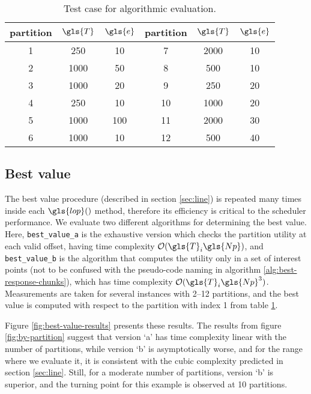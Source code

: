 \documentclass[main.tex]{subfiles}
\begin{document}
\begin{table}[htbp]
    \centering
    \caption{Test case for algorithmic evaluation.}
    \label{tab:case1}
    \begin{tabular}{ccc|ccc}
        \toprule
        partition & $\gls{T}$ & $\gls{e}$ & partition & $\gls{T}$ & $\gls{e}$ \\
        \midrule
        \num{1}  &  \num{250 } & \num{10 } &  \num{7 }  & \num{2000}  &  \num{10} \\ 
        \num{2}  &  \num{1000} & \num{50 } &  \num{8 }  & \num{500 }  &  \num{10} \\ 
        \num{3}  &  \num{1000} & \num{20 } &  \num{9 }  & \num{250 }  &  \num{20} \\ 
        \num{4}  &  \num{250 } & \num{10 } &  \num{10}  & \num{1000}  &  \num{20} \\ 
        \num{5}  &  \num{1000} & \num{100} &  \num{11}  & \num{2000}  &  \num{30} \\ 
        \num{6}  &  \num{1000} & \num{10 } &  \num{12}  & \num{500 }  &  \num{40} \\ 
        \bottomrule
    \end{tabular}
\end{table}

\subsection{Best value}

The best value procedure (described in section \ref{sec:line}) is repeated many times inside each $\gls{lop}()$ method, therefore its efficiency is critical to the scheduler performance.
We evaluate two different algorithms for determining the best value.
Here, \texttt{best\_value\_a} is the exhaustive version which checks the partition utility at each valid offset, having time complexity $\bigO(\gls{T}_i\gls{Np})$, and \texttt{best\_value\_b} is the algorithm that computes the utility only in a set of interest points (not to be confused with the pseudo-code naming in algorithm \ref{alg:best-response-chunks}), which has time complexity $\bigO(\gls{T}_i\gls{Np}^3)$.
Measurements are taken for several instances with \numrange{2}{12} partitions, and the best value is computed with respect to the partition with index \num{1} from table \ref{tab:case1}.

Figure \ref{fig:best-value-results} presents these results.
The results from figure \ref{fig:by-partition} suggest that version `a' has time complexity linear with the number of partitions, while version `b' is asymptotically worse, and for the range where we evaluate it, it is consistent with the cubic complexity predicted in section \ref{sec:line}.
Still, for a moderate number of partitions, version `b' is superior, and the turning point for this example is observed at \num{10} partitions.
\end{document}
